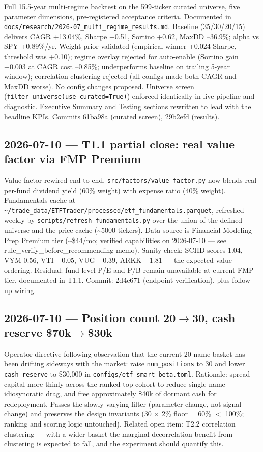 \documentclass[11pt,a4paper]{article}
\begin{document}
Full 15.5-year multi-regime backtest on the 599-ticker curated universe, five parameter dimensions, pre-registered acceptance criteria. Documented in \texttt{docs/research/2026-07\_multi\_regime\_results.md}. Baseline (35/30/20/15) delivers CAGR +13.04\%, Sharpe +0.51, Sortino +0.62, MaxDD --36.9\%; alpha vs SPY +0.89\%/yr. Weight prior validated (empirical winner +0.024 Sharpe, threshold was +0.10); regime overlay rejected for auto-enable (Sortino gain +0.003 at CAGR cost --0.85\%; underperforms baseline on trailing 5-year window); correlation clustering rejected (all configs made both CAGR and MaxDD worse). No config changes proposed. Universe screen (\texttt{filter\_universe(use\_curated=True)}) enforced identically in live pipeline and diagnostic. Executive Summary and Testing sections rewritten to lead with the headline KPIs. Commits 61ba98a (curated screen), 29b2efd (results).

\subsection*{2026-07-10 --- T1.1 partial close: real value factor via FMP Premium}

Value factor rewired end-to-end. \texttt{src/factors/value\_factor.py} now blends real per-fund dividend yield (60\% weight) with expense ratio (40\% weight). Fundamentals cache at \texttt{\textasciitilde/trade\_data/ETFTrader/processed/etf\_fundamentals.parquet}, refreshed weekly by \texttt{scripts/refresh\_fundamentals.py} over the union of the defined universe and the price cache (\textasciitilde 5000 tickers). Data source is Financial Modeling Prep Premium tier (\textasciitilde\$44/mo; verified capabilities on 2026-07-10 --- see rule\_verify\_before\_recommending memo). Sanity check: SCHD scores 1.04, VYM 0.56, VTI $-0.05$, VUG $-0.39$, ARKK $-1.81$ --- the expected value ordering. Residual: fund-level P/E and P/B remain unavailable at current FMP tier, documented in T1.1. Commit: 2d4c671 (endpoint verification), plus follow-up wiring.

\subsection*{2026-07-10 --- Position count 20$\rightarrow$30, cash reserve \$70k$\rightarrow$\$30k}

Operator directive following observation that the current 20-name basket has been drifting sideways with the market: raise \texttt{num\_positions} to 30 and lower \texttt{cash\_reserve} to \$30{,}000 in \texttt{configs/etf\_smart\_beta.toml}. Rationale: spread capital more thinly across the ranked top-cohort to reduce single-name idiosyncratic drag, and free approximately \$40k of dormant cash for redeployment. Passes the slowly-varying filter (parameter change, not signal change) and preserves the design invariants (30 $\times$ 2\% floor = 60\% $<$ 100\%; ranking and scoring logic untouched). Related open item: T2.2 correlation clustering --- with a wider basket the marginal decorrelation benefit from clustering is expected to fall, and the experiment should quantify this.
\end{document}

